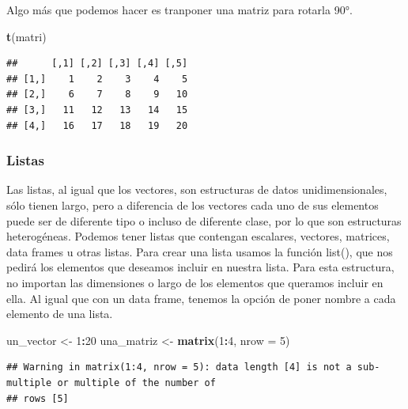 \documentclass[
]{book}
\newenvironment{Shaded}{\begin{snugshade}}{\end{snugshade}}
\newcommand{\AttributeTok}[1]{\textcolor[rgb]{0.13,0.29,0.53}{#1}}
\newcommand{\DecValTok}[1]{\textcolor[rgb]{0.00,0.00,0.81}{#1}}
\newcommand{\FunctionTok}[1]{\textcolor[rgb]{0.13,0.29,0.53}{\textbf{#1}}}
\newcommand{\NormalTok}[1]{#1}
\newcommand{\OtherTok}[1]{\textcolor[rgb]{0.56,0.35,0.01}{#1}}
\newcommand{\SpecialCharTok}[1]{\textcolor[rgb]{0.81,0.36,0.00}{\textbf{#1}}}
\begin{document}
Algo más que podemos hacer es tranponer una matriz para rotarla 90°.

\begin{Shaded}
\begin{Highlighting}[]
\FunctionTok{t}\NormalTok{(matri)}
\end{Highlighting}
\end{Shaded}

\begin{verbatim}
##      [,1] [,2] [,3] [,4] [,5]
## [1,]    1    2    3    4    5
## [2,]    6    7    8    9   10
## [3,]   11   12   13   14   15
## [4,]   16   17   18   19   20
\end{verbatim}

\subsubsection{Listas}\label{listas}

Las listas, al igual que los vectores, son estructuras de datos unidimensionales, sólo tienen largo, pero a diferencia de los vectores cada uno de sus elementos puede ser de diferente tipo o incluso de diferente clase, por lo que son estructuras heterogéneas.
Podemos tener listas que contengan escalares, vectores, matrices, data frames u otras listas.
Para crear una lista usamos la función list(), que nos pedirá los elementos que deseamos incluir en nuestra lista.
Para esta estructura, no importan las dimensiones o largo de los elementos que queramos incluir en ella.
Al igual que con un data frame, tenemos la opción de poner nombre a cada elemento de una lista.

\begin{Shaded}
\begin{Highlighting}[]
\NormalTok{un\_vector }\OtherTok{\textless{}{-}} \DecValTok{1}\SpecialCharTok{:}\DecValTok{20}
\NormalTok{una\_matriz }\OtherTok{\textless{}{-}} \FunctionTok{matrix}\NormalTok{(}\DecValTok{1}\SpecialCharTok{:}\DecValTok{4}\NormalTok{, }\AttributeTok{nrow =} \DecValTok{5}\NormalTok{)}
\end{Highlighting}
\end{Shaded}

\begin{verbatim}
## Warning in matrix(1:4, nrow = 5): data length [4] is not a sub-multiple or multiple of the number of
## rows [5]
\end{verbatim}
\end{document}
